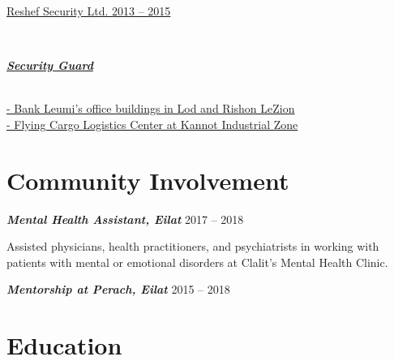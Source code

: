 \documentclass[
	11pt,a4paper %
]{article}
\newcommand{\jobentry}[5]{
	{\raggedleft\textsc{#1\expandafter\ifstrequal\expandafter{#2}{}{}{\hspace{6pt}\footnotesize{(#2)}}}\par} %
	\expandafter\ifstrequal\expandafter{#3}{}{}{{\raggedright\large #3}\\} %
	\expandafter\ifstrequal\expandafter{#4}{}{}{{\raggedright\large\textit{\textbf{#4}}}\\[4pt]} %
	\expandafter\ifstrequal\expandafter{#5}{}{}{#5} %
	\medskip %
}
\newcommand{\qualificationentry}[5]{
	\textsc{#1} & \textbf{#2}\\ %
	\expandafter\ifstrequal\expandafter{#3}{}{}{& {\small\textsc{#3}}\\} %
	\expandafter\ifstrequal\expandafter{#4}{}{}{& #4\\} %
	\expandafter\ifstrequal\expandafter{#5}{}{}{& \textit{#5}\\[5pt]} %
}
\begin{document}
\begin{paracol}{2}
\hrulefill

\jobentry
	{} %
	{} %
	{\href{https://loona-il.000webhostapp.com/resume-references/recommendation-letter-security-guard.jpg}{Reshef Security Ltd. \hfill 2013 -- 2015}} %
	{\href{https://loona-il.000webhostapp.com/resume-references/recommendation-letter-security-guard.jpg}{Security Guard}} %
	{\href{https://loona-il.000webhostapp.com/resume-references/recommendation-letter-security-guard.jpg}{- Bank Leumi's office buildings in Lod and Rishon LeZion\\
- Flying Cargo Logistics Center at Kannot Industrial Zone
}}

	\section{Community Involvement}

\textbf{\textit{Mental Health Assistant, Eilat}} \hfill 2017 -- 2018

Assisted physicians, health practitioners, and psychiatrists in working with patients with mental or emotional disorders at Clalit's Mental Health Clinic.

\textbf{\textit{Mentorship at Perach, Eilat}} \hfill 2015 -- 2018
\switchcolumn %

\section{Education}






\end{paracol}
\end{document}
